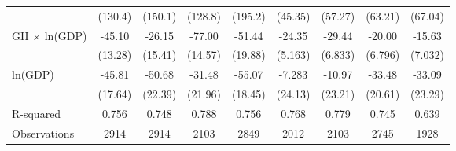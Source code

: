 \documentclass[10pt,letterpaper,subeqn]{beamer}
\begin{document}
\begin{frame}
\begin{table}[htbp]
{\begin{tabular}{l*{8}{c}}
            &     (130.4)         &     (150.1)         &     (128.8)         &     (195.2)         &     (45.35)         &     (57.27)         &     (63.21)         &     (67.04)         \\
GII $\times$ ln(GDP)&      -45.10\sym{***}&      -26.15\sym{*}  &      -77.00\sym{***}&      -51.44\sym{**} &      -24.35\sym{***}&      -29.44\sym{***}&      -20.00\sym{***}&      -15.63\sym{**} \\
            &     (13.28)         &     (15.41)         &     (14.57)         &     (19.88)         &     (5.163)         &     (6.833)         &     (6.796)         &     (7.032)         \\
ln(GDP)             &      -45.81\sym{**} &      -50.68\sym{**} &      -31.48         &      -55.07\sym{***}&      -7.283         &      -10.97         &      -33.48         &      -33.09         \\
            &     (17.64)         &     (22.39)         &     (21.96)         &     (18.45)         &     (24.13)         &     (23.21)         &     (20.61)         &     (23.29)         \\
\midrule
R-squared           &       0.756         &       0.748         &       0.788         &       0.756         &       0.768         &       0.779         &       0.745         &       0.639         \\
Observations        &        2914         &        2914         &        2103         &        2849         &        2012         &        2103         &        2745         &        1928         \\
\bottomrule\end{tabular}}\end{table}
\end{frame}
\end{document}

